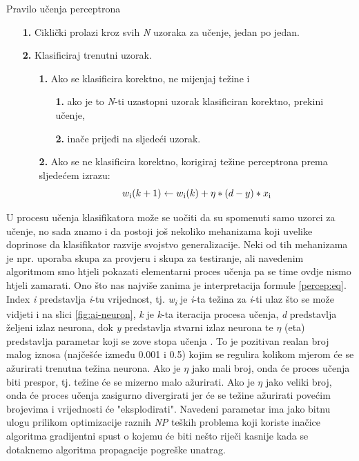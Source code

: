 \documentclass[times, utf8, zavrsni]{fer}
\begin{document}
\begin{algorithm}
\caption{Pravilo učenja perceptrona\footnotemark}
\label{algo:alg-perceptron}
    \begin{enumerate}
        \item[\textbf{1.}] Ciklički prolazi kroz svih \textit{N} uzoraka za učenje, jedan po jedan.
        \item[\textbf{2.}] Klasificiraj trenutni uzorak.
        \begin{enumerate}
            \item[\textbf{1.}] Ako se klasificira korektno, ne mijenjaj težine i
            \begin{enumerate}
                \item[\textbf{1.}] ako je to \textit{N}-ti uzastopni uzorak klasificiran korektno, prekini učenje,
                \item[\textbf{2.}] inače prijeđi na sljedeći uzorak.
            \end{enumerate}
            \item[\textbf{2.}] Ako se ne klasificira korektno, korigiraj težine perceptrona prema sljedećem izrazu: 
            \begin{equation}
            \label{percep:eq}
                w\textsubscript{i}(k+1) \leftarrow w\textsubscript{i}(k) + \eta * (d-y) * x\textsubscript{i}
            \end{equation}
        \end{enumerate}
    \end{enumerate}
\end{algorithm}

U procesu učenja klasifikatora može se uočiti da su spomenuti samo uzorci za učenje, no sada znamo i da postoji još nekoliko mehanizama koji uvelike doprinose da klasifikator razvije svojstvo generalizacije. Neki od tih mehanizama je npr. uporaba skupa za provjeru i skupa za testiranje, ali navedenim algoritmom smo htjeli pokazati elementarni proces učenja pa se time ovdje nismo htjeli zamarati. Ono što nas najviše zanima je interpretacija formule \eqref{percep:eq}. Index \textit{i} predstavlja \textit{i}-tu vrijednost, tj. \textit{w\textsubscript{i}} je \textit{i}-ta težina za \textit{i}-ti ulaz što se može vidjeti i na slici \ref{fig:ai-neuron}, \textit{k} je \textit{k}-ta iteracija procesa učenja, \textit{d} predstavlja željeni  izlaz neurona, dok \textit{y} predstavlja stvarni izlaz neurona te $\eta$ (eta) predstavlja parametar koji se zove stopa učenja . To je pozitivan realan broj malog iznosa (najčešće između 0.001 i 0.5) kojim se regulira kolikom mjerom će se ažurirati trenutna težina neurona. Ako je $\eta$ jako mali broj, onda će proces učenja biti prespor, tj. težine će se mizerno malo ažurirati. Ako je $\eta$ jako veliki broj, onda će proces učenja zasigurno divergirati jer će se težine ažurirati povećim brojevima i vrijednosti će "eksplodirati". Navedeni parametar ima jako bitnu ulogu prilikom optimizacije raznih \textit{NP} teških problema koji koriste inačice algoritma gradijentni spust o kojemu će biti nešto riječi kasnije kada se dotaknemo algoritma propagacije pogreške unatrag.
\end{document}

